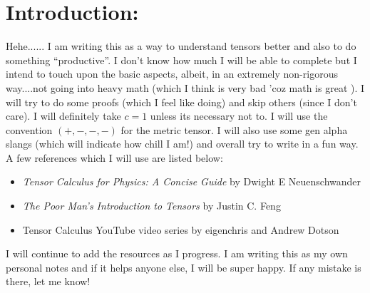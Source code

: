 \section{Introduction:}
Hehe...... I am writing this as a way to understand tensors better and also to do something ``productive''. I don't know how much I will be able to complete but I intend to touch upon the basic aspects, albeit, in an extremely non-rigorous way....not going into heavy math (which I think is very bad 'coz math is great ). I will try to do some proofs (which I feel like doing) and skip others (since I don't care). I will definitely take $c=1$ unless its necessary not to. I will use the convention $(+,-,-,-)$ for the metric tensor. I will also use some gen alpha slangs (which will indicate how chill I am!) and overall try to write in a fun way. A few references which I will use are listed below:
\begin{itemize}
    \item \textit{Tensor Calculus for Physics: A Concise Guide
} by Dwight E Neuenschwander
\item \textit{The Poor Man’s Introduction to Tensors} by Justin C. Feng
\item Tensor Calculus YouTube video series by eigenchris and Andrew Dotson
\end{itemize}
I will continue to add the resources as I progress. I am writing this as my own personal notes and if it helps anyone else, I will be super happy. If any mistake is there, let me know! 